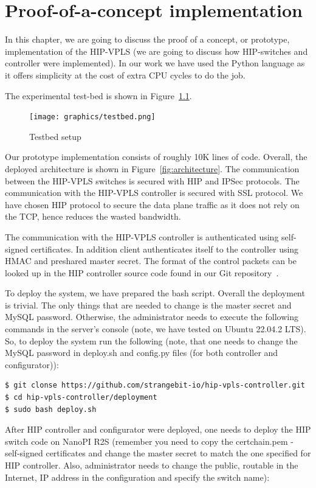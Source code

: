\chapter{Proof-of-a-concept implementation}
In this chapter, we are going to discuss the proof of a concept, or prototype,
implementation of the HIP-VPLS (we are going to discuss how HIP-switches and 
controller were implemented). In our work we have used the Python language 
as it offers simplicity at the cost of extra CPU cycles to do the job.

The experimental test-bed is shown in Figure~\ref{fig:testbed}.

\begin{figure}[h!]
\centering
\texttt{[image: graphics/testbed.png]}
\caption{Testbed setup}
\label{fig:testbed}
\end{figure}    

Our prototype implementation consists of roughly 10K lines of code. Overall,
the deployed architecture is shown in Figure~\ref{fig:architecture}. The communication
between the HIP-VPLS switches is secured with HIP and IPSec protocols. The communication
with the HIP-VPLS controller is secured with SSL protocol. We have chosen HIP protocol
to secure the data plane traffic as it does not rely on the TCP, hence reduces the 
wasted bandwidth. 

The communication with the HIP-VPLS controller is authenticated using self-signed
certificates. In addition client authenticates itself to the controller using HMAC
and preshared master secret. The format of the control packets can be looked up in the 
HIP controller source code found in our Git repository~\cite{controller-impl}. 

To deploy the system, we have prepared the bash script. Overall the deployment is trivial.
The only things that are needed to change is the master secret and MySQL password. Otherwise,
the administrator needs to execute the following commands in the server's console (note, 
we have tested on Ubuntu 22.04.2 LTS). So, to deploy the system run the following (note,
that one needs to change the MySQL password in deploy.sh and config.py files (for
both controller and configurator)):

\begin{verbatim}
$ git clonse https://github.com/strangebit-io/hip-vpls-controller.git
$ cd hip-vpls-controller/deployment
$ sudo bash deploy.sh
\end{verbatim}

After HIP controller and configurator were deployed, one needs to deploy the HIP switch code
on NanoPI R2S (remember you need to copy the certchain.pem - self-signed certificates
and change the master secret to match the one specified for HIP controller. Also, 
administrator needs to change the public, routable in the Internet, IP address in the 
configuration and specify the switch name):


